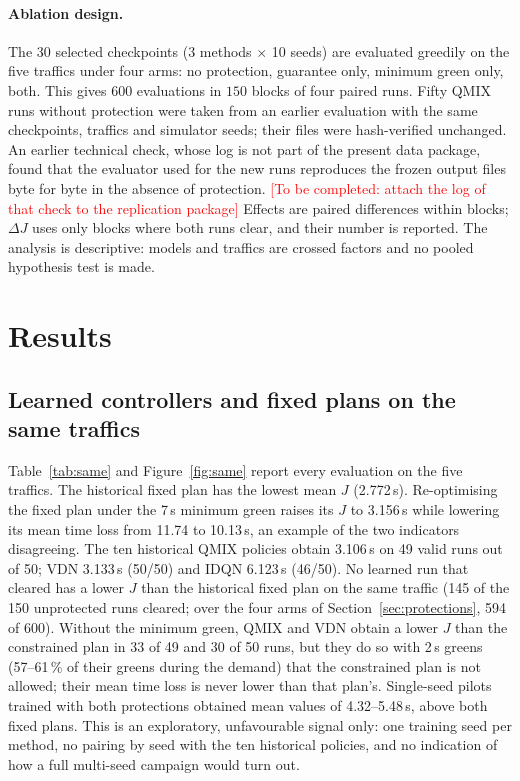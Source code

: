 \documentclass[11pt]{article}
\newcommand{\tocomplete}[1]{\textcolor{red}{[To be completed: #1]}}
\begin{document}
\paragraph{Ablation design.}
The 30 selected checkpoints (3 methods $\times$ 10 seeds) are evaluated greedily on the five traffics under
four arms: no protection, guarantee only, minimum green only, both. This gives 600 evaluations in
$150$ blocks of four paired runs. Fifty QMIX runs without protection were taken from an earlier evaluation
with the same checkpoints, traffics and simulator seeds; their files were hash-verified unchanged. An earlier
technical check, whose log is not part of the present data package, found that the evaluator used for the new
runs reproduces the frozen output files byte for byte in the absence of protection.
\tocomplete{attach the log of that check to the replication package} Effects are paired differences within blocks; $\Delta J$
uses only blocks where both runs clear, and their number is reported. The analysis is descriptive: models and
traffics are crossed factors and no pooled hypothesis test is made.

\section{Results}
\subsection{Learned controllers and fixed plans on the same traffics}
Table~\ref{tab:same} and Figure~\ref{fig:same} report every evaluation on the five traffics. The historical
fixed plan has the lowest mean $J$ (2.772\,s). Re-optimising the fixed plan under the 7\,s minimum green
raises its $J$ to 3.156\,s while lowering its mean time loss from 11.74 to 10.13\,s, an example of the two
indicators disagreeing. The ten historical QMIX policies obtain 3.106\,s on 49 valid runs out of 50; VDN
3.133\,s (50/50) and IDQN 6.123\,s (46/50). No learned run that cleared has a lower $J$ than the historical fixed plan on the same traffic
(145 of the 150 unprotected runs cleared; over the four arms of Section~\ref{sec:protections}, 594 of 600). Without the minimum green, QMIX and VDN obtain a lower $J$ than the constrained plan in 33
of 49 and 30 of 50 runs, but they do so with 2\,s greens (57--61\,\% of their greens during the demand) that
the constrained plan is not allowed; their mean time loss is never lower than that plan's. Single-seed pilots
trained with both protections obtained mean values of 4.32--5.48\,s, above both fixed plans. This is an
exploratory, unfavourable signal only: one training seed per method, no pairing by seed with the ten
historical policies, and no indication of how a full multi-seed campaign would turn out.
\end{document}
